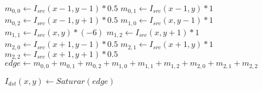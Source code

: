 \begin{algorithm}[H]
  \begin{algorithmic}[1]
  
		
			  
			  \STATE $m_{0,0} \gets I_{src}(x-1,y-1)*0.5$
			  \STATE $m_{0,1} \gets I_{src}(x-1,y)*1$
			  \STATE $m_{0,2} \gets I_{src}(x-1,y+1)*0.5$
			  \STATE $m_{1,0} \gets I_{src}(x,y-1)*1$
			  \STATE $m_{1,1} \gets I_{src}(x,y)*(-6)$
			  \STATE $m_{1,2} \gets I_{src}(x,y+1)*1$
			  \STATE $m_{2,0} \gets I_{src}(x+1,y-1)*0.5$
			  \STATE $m_{2,1} \gets I_{src}(x+1,y)*1$
			  \STATE $m_{2,2} \gets I_{src}(x+1,y+1)*0.5$
			  \STATE $edge \gets m_{0,0}+m_{0,1}+m_{0,2}+m_{1,0}+m_{1,1}+m_{1,2}+m_{2,0}+m_{2,1}+m_{2,2}$
		
			  \STATE $I_{dst}(x,y) \gets Saturar(edge)$
			  
			\ENDFOR

		 \ENDFOR

  \end{algorithmic}
  \caption{$edge (I_{src}, I_{dst})$}
  \label{alg:edge}
\end{algorithm}

